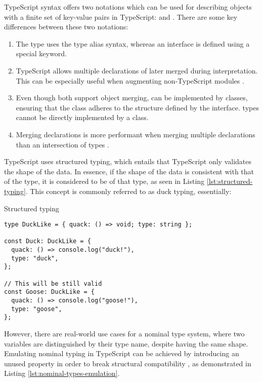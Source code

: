 TypeScript syntax offers two notations which can be used for describing objects with a finite set of key-value pairs in TypeScript:  and . There are some key differences between these two notations:

\begin{enumerate}
  \item The  type uses the type alias syntax, whereas an interface is defined using a special  keyword.
  \item TypeScript allows multiple declarations of  later merged during interpretation. This can be especially useful when augmenting non-TypeScript modules \cite{DocumentationDeclarationMerging}. 
  \item Even though both support object merging,  can be implemented by classes, ensuring that the class adheres to the structure defined by the interface.  types cannot be directly implemented by a class.
  \item Merging  declarations is more performant when merging multiple declarations than an intersection of  types \cite{Performance}.
\end{enumerate}

TypeScript uses structured typing, which entails that TypeScript only validates the shape of the data. In essence, if the shape of the data is consistent with that of the type, it is considered to be of that type, as seen in Listing \ref{lst:structured-typing}. This concept is commonly referred to as duck typing, essentially: 

\begin{listing}[ht]
  \caption{Structured typing}\label{lst:structured-typing}
  \begin{verbatim}
type DuckLike = { quack: () => void; type: string };

const Duck: DuckLike = {
  quack: () => console.log("duck!"),
  type: "duck",
};

// This will be still valid
const Goose: DuckLike = {
  quack: () => console.log("goose!"),
  type: "goose",
};
\end{verbatim}
\end{listing}

However, there are real-world use cases for a nominal type system, where two variables are distinguished by their type name, despite having the same shape. Emulating nominal typing in TypeScript can be achieved by introducing an unused property in order to break structural compatibility \cite{NominalTyping}, as demonstrated in Listing \ref{lst:nominal-types-emulation}.


